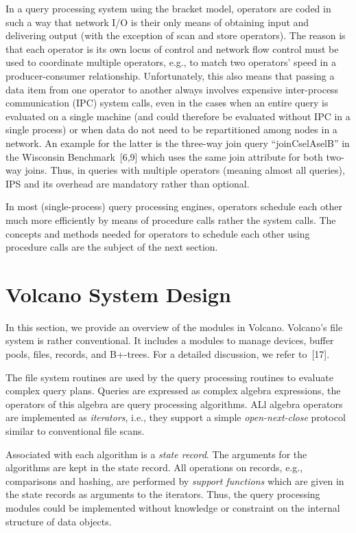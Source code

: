 \documentclass[a4paper,11pt,notitlepage,twoside,openright]{article}
\begin{document}
In a query processing system using the bracket
model, operators are coded in such a way that network I/O
is their only means of obtaining input and delivering output
(with the exception of scan and store operators). The reason
is that each operator is its own locus of control and
network flow control must be used to coordinate multiple
operators, e.g., to match two operators' speed in a
producer-consumer relationship. Unfortunately, this also
means that passing a data item from one operator to
another always involves expensive inter-process communication
(IPC) system calls, even in the cases when an entire
query is evaluated on a single machine (and could therefore
be evaluated without IPC in a single process) or when data
do not need to be repartitioned among nodes in a network.
An example for the latter is the three-way join query
``joinCselAselB'' in the Wisconsin Benchmark~{[6,9]} which
uses the same join attribute for both two-way joins. Thus,
in queries with multiple operators (meaning almost all
queries), IPS and its overhead are mandatory rather than optional.

In most (single-process) query processing engines,
operators schedule each other much more efficiently by
means of procedure calls rather the system calls. The concepts
and methods needed for operators to schedule each
other using procedure calls are the subject of the next section.

\section{Volcano System Design}

In this section, we provide an overview of the
modules in Volcano. Volcano's file system is rather conventional.
It includes a modules to manage devices, buffer
pools, files, records, and B+-trees. For a detailed discussion,
we refer to~{[17]}.

The file system routines are used by the query processing
routines to evaluate complex query plans. Queries
are expressed as complex algebra expressions, the operators
of this algebra are query processing algorithms. ALl algebra
operators are implemented as \emph{iterators}, i.e., they support a
simple \emph{open-next-close} protocol similar to conventional file scans.

Associated with each algorithm is a \emph{state record}.
The arguments for the algorithms are kept in the state
record. All operations on records, e.g., comparisons and
hashing, are performed by \emph{support functions} which are given
in the state records as arguments to the iterators. Thus, the
query processing modules could be implemented without
knowledge or constraint on the internal structure of data objects.
\end{document}
